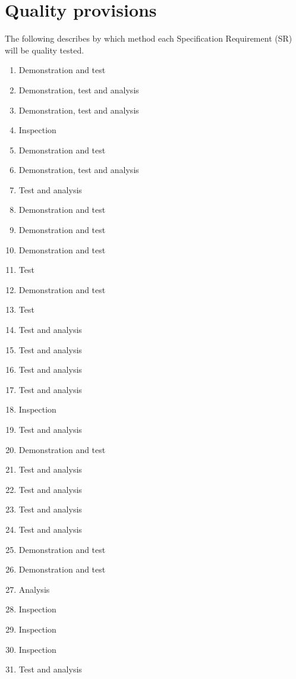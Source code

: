\documentclass[Main]{subfiles}
\begin{document}
\chapter{Quality provisions}
The following describes by which method each Specification Requirement (SR) will be quality tested.

\begin{enumerate}[{SR}-1:]
\setcounter{enumi}{0}
\item Demonstration and test
\item Demonstration, test and analysis
\item Demonstration, test and analysis

\item Inspection
\item Demonstration and test
\item Demonstration, test and analysis
\item Test and analysis

\item Demonstration and test
\item Demonstration and test
\item Demonstration and test
\item Test

\item Demonstration and test 
\item Test

\item Test and analysis
\item Test and analysis
\item Test and analysis

\item Test and analysis

\item Inspection 
\item Test and analysis
\item Demonstration and test

\item Test and analysis

\item Test and analysis
\item Test and analysis
\item Test and analysis

\item Demonstration and test
\item Demonstration and test
\item Analysis

\item Inspection
\item Inspection
\item Inspection
\item Test and analysis

\end{enumerate}
\end{document}
